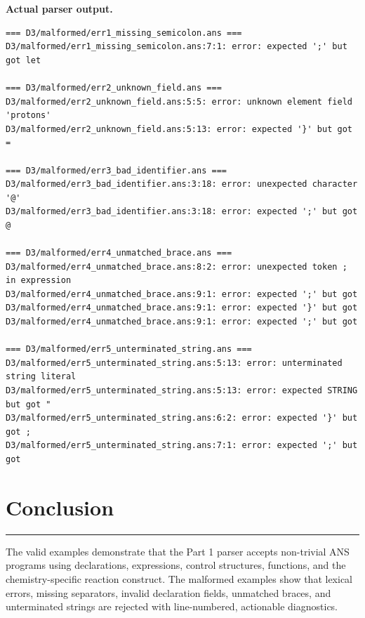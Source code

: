 \documentclass[11pt,a4paper]{article}
\newcommand{\sectionrule}{\vspace{-3pt}\textcolor{ansborder}{\rule{\textwidth}{0.6pt}}\vspace{2pt}}
\begin{document}
\newpage
\textbf{Actual parser output.}
\begin{lstlisting}[style=terminal]
=== D3/malformed/err1_missing_semicolon.ans ===
D3/malformed/err1_missing_semicolon.ans:7:1: error: expected ';' but got let

=== D3/malformed/err2_unknown_field.ans ===
D3/malformed/err2_unknown_field.ans:5:5: error: unknown element field 'protons'
D3/malformed/err2_unknown_field.ans:5:13: error: expected '}' but got =

=== D3/malformed/err3_bad_identifier.ans ===
D3/malformed/err3_bad_identifier.ans:3:18: error: unexpected character '@'
D3/malformed/err3_bad_identifier.ans:3:18: error: expected ';' but got @

=== D3/malformed/err4_unmatched_brace.ans ===
D3/malformed/err4_unmatched_brace.ans:8:2: error: unexpected token ; in expression
D3/malformed/err4_unmatched_brace.ans:9:1: error: expected ';' but got
D3/malformed/err4_unmatched_brace.ans:9:1: error: expected '}' but got
D3/malformed/err4_unmatched_brace.ans:9:1: error: expected ';' but got

=== D3/malformed/err5_unterminated_string.ans ===
D3/malformed/err5_unterminated_string.ans:5:13: error: unterminated string literal
D3/malformed/err5_unterminated_string.ans:5:13: error: expected STRING but got "
D3/malformed/err5_unterminated_string.ans:6:2: error: expected '}' but got ;
D3/malformed/err5_unterminated_string.ans:7:1: error: expected ';' but got
\end{lstlisting}

\section{Conclusion}
\sectionrule

The valid examples demonstrate that the Part 1 parser accepts non-trivial ANS programs using declarations, expressions, control structures, functions, and the chemistry-specific reaction construct. The malformed examples show that lexical errors, missing separators, invalid declaration fields, unmatched braces, and unterminated strings are rejected with line-numbered, actionable diagnostics.
\end{document}

